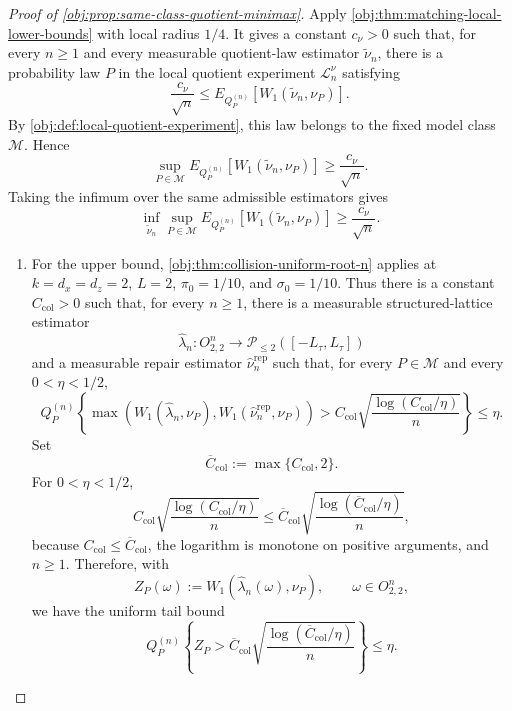 \documentclass[11pt]{article}
\begin{document}
\begin{proof}[Proof of \cref{obj:prop:same-class-quotient-minimax}]
Apply \cref{obj:thm:matching-local-lower-bounds} with local radius \(1/4\). It gives a constant \(c_{\nu}>0\) such that, for every \(n\ge 1\) and every measurable quotient-law estimator \(\widetilde\nu_n\), there is a probability law \(P\) in the local quotient experiment \(\mathcal L_n^\nu\) satisfying
\[
  \frac{c_{\nu}}{\sqrt n}
  \le
  E_{Q_P^{(n)}}\!\left[
    W_1\!\left(\widetilde\nu_n,\nu_P\right)
  \right].
\]
By \cref{obj:def:local-quotient-experiment}, this law belongs to the fixed model class \(\mathcal M\). Hence
\[
  \sup_{P\in\mathcal M}
  E_{Q_P^{(n)}}\!\left[
    W_1\!\left(\widetilde\nu_n,\nu_P\right)
  \right]
  \ge
  \frac{c_{\nu}}{\sqrt n}.
\]
Taking the infimum over the same admissible estimators gives
\[
  \inf_{\widetilde\nu_n}
  \sup_{P\in\mathcal M}
  E_{Q_P^{(n)}}\!\left[
    W_1\!\left(\widetilde\nu_n,\nu_P\right)
  \right]
  \ge
  \frac{c_{\nu}}{\sqrt n}.
\]

\begin{enumerate}
\item
For the upper bound, \cref{obj:thm:collision-uniform-root-n} applies at
\(k=d_x=d_z=2\), \(L=2\), \(\pi_0=1/10\), and \(\sigma_0=1/10\). Thus there is a constant \(C_{\mathrm{col}}>0\) such that, for every \(n\ge 1\), there is a measurable structured-lattice estimator
\[
  \widehat\lambda_n:O_{2,2}^n\to
  \mathcal P_{\le 2}([-L_\tau,L_\tau])
\]
and a measurable repair estimator \(\widehat\nu_n^{\mathrm{rep}}\) such that, for every \(P\in\mathcal M\) and every \(0<\eta<1/2\),
\[
  Q_P^{(n)}\!\left\{
    \max\!\left(
      W_1(\widehat\lambda_n,\nu_P),
      W_1(\widehat\nu_n^{\mathrm{rep}},\nu_P)
    \right)
    >
    C_{\mathrm{col}}
    \sqrt{\frac{\log(C_{\mathrm{col}}/\eta)}{n}}
  \right\}
  \le \eta .
\]
Set
\[
  \overline C_{\mathrm{col}}:=\max\{C_{\mathrm{col}},2\}.
\]
For \(0<\eta<1/2\),
\[
  C_{\mathrm{col}}
  \sqrt{\frac{\log(C_{\mathrm{col}}/\eta)}{n}}
  \le
  \overline C_{\mathrm{col}}
  \sqrt{\frac{\log(\overline C_{\mathrm{col}}/\eta)}{n}},
\]
because \(C_{\mathrm{col}}\le\overline C_{\mathrm{col}}\), the logarithm is monotone on positive arguments, and \(n\ge1\). Therefore, with
\[
  Z_P(\omega):=
  W_1\!\left(\widehat\lambda_n(\omega),\nu_P\right),
  \qquad \omega\in O_{2,2}^n,
\]
we have the uniform tail bound
\[
  Q_P^{(n)}\!\left\{
    Z_P>
    \overline C_{\mathrm{col}}
    \sqrt{\frac{\log(\overline C_{\mathrm{col}}/\eta)}{n}}
  \right\}
  \le \eta .
\]


\end{enumerate}
\end{proof}
\end{document}

